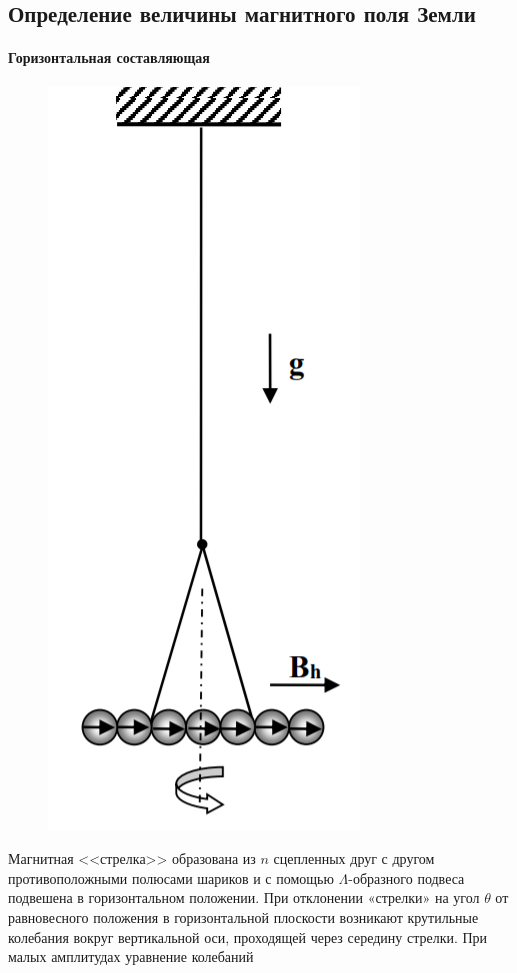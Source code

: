 \documentclass[a4paper,12pt]{article}
\begin{document}
\subsection*{Определение величины магнитного поля Земли}
\paragraph*{Горизонтальная составляющая}
\begin{figure}
\includegraphics[scale=0.5]{1.png}
\vspace{-60pt}
\end{figure}  
Магнитная <<стрелка>> образована из $n$ сцепленных друг с другом противоположными полюсами шариков и с помощью $\Lambda$-образного подвеса подвешена в горизонтальном положении. При отклонении «стрелки» на угол $\theta$ от равновесного положения в горизонтальной плоскости возникают крутильные колебания вокруг вертикальной оси, проходящей через середину стрелки. При малых амплитудах уравнение колебаний
\end{document}
